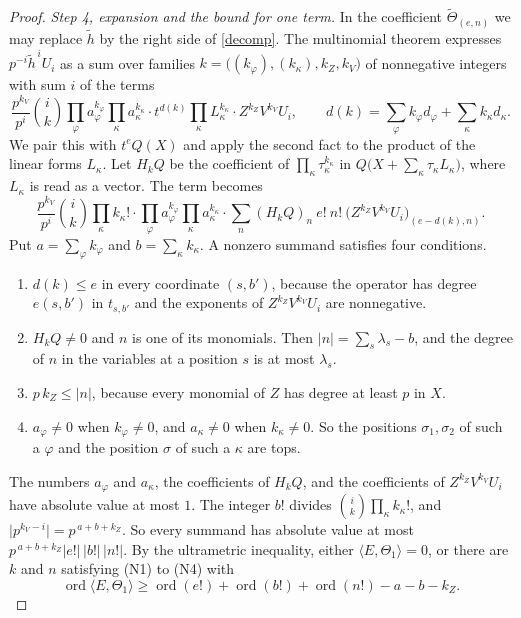 \begin{proof}
\emph{Step 4, expansion and the bound for one term.} In the coefficient $\widetilde\Theta_{(e,n)}$ we may replace $\widetilde h$ by the right side of \eqref{decomp}. The multinomial theorem expresses $p^{-i}\widetilde h^{\,i}U_i$ as a sum over families $k=\big((k_\varphi),(k_\kappa),k_Z,k_V\big)$ of nonnegative integers with sum $i$ of the terms
\[
\frac{p^{k_V}}{p^i}\binom ik\prod_\varphi a_\varphi^{k_\varphi}\prod_\kappa a_\kappa^{k_\kappa}\cdot t^{d(k)}\prod_\kappa L_\kappa^{k_\kappa}\cdot Z^{k_Z}V^{k_V}U_i,\qquad d(k)=\sum_\varphi k_\varphi d_\varphi+\sum_\kappa k_\kappa d_\kappa .
\]
We pair this with $t^eQ(X)$ and apply the second fact to the product of the linear forms $L_\kappa$. Let $H_kQ$ be the coefficient of $\prod_\kappa\tau_\kappa^{k_\kappa}$ in $Q\big(X+\sum_\kappa\tau_\kappa L_\kappa\big)$, where $L_\kappa$ is read as a vector. The term becomes
\[
\frac{p^{k_V}}{p^i}\binom ik\prod_\kappa k_\kappa!\cdot\prod_\varphi a_\varphi^{k_\varphi}\prod_\kappa a_\kappa^{k_\kappa}\cdot\sum_n(H_kQ)_n\ e!\ n!\ \big(Z^{k_Z}V^{k_V}U_i\big)_{(e-d(k),n)} .
\]
Put $a=\sum_\varphi k_\varphi$ and $b=\sum_\kappa k_\kappa$. A nonzero summand satisfies four conditions.
\begin{enumerate}
\item[(N1)] $d(k)\le e$ in every coordinate $(s,b')$, because the operator has degree $e(s,b')$ in $t_{s,b'}$ and the exponents of $Z^{k_Z}V^{k_V}U_i$ are nonnegative.
\item[(N2)] $H_kQ\ne0$ and $n$ is one of its monomials. Then $\lvert n\rvert=\sum_s\lambda_s-b$, and the degree of $n$ in the variables at a position $s$ is at most $\lambda_s$.
\item[(N3)] $p\,k_Z\le\lvert n\rvert$, because every monomial of $Z$ has degree at least $p$ in $X$.
\item[(N4)] $a_\varphi\ne0$ when $k_\varphi\ne0$, and $a_\kappa\ne0$ when $k_\kappa\ne0$. So the positions $\sigma_1,\sigma_2$ of such a $\varphi$ and the position $\sigma$ of such a $\kappa$ are tops.
\end{enumerate}
The numbers $a_\varphi$ and $a_\kappa$, the coefficients of $H_kQ$, and the coefficients of $Z^{k_Z}V^{k_V}U_i$ have absolute value at most $1$. The integer $b!$ divides $\binom ik\prod_\kappa k_\kappa!$, and $\lvert p^{k_V-i}\rvert=p^{\,a+b+k_Z}$. So every summand has absolute value at most $p^{\,a+b+k_Z}\lvert e!\rvert\,\lvert b!\rvert\,\lvert n!\rvert$. By the ultrametric inequality, either $\langle E,\Theta_1\rangle=0$, or there are $k$ and $n$ satisfying (N1) to (N4) with
\begin{equation}\label{termbound}
\operatorname{ord}\langle E,\Theta_1\rangle\ge\operatorname{ord}(e!)+\operatorname{ord}(b!)+\operatorname{ord}(n!)-a-b-k_Z .
\end{equation}


\end{proof}

